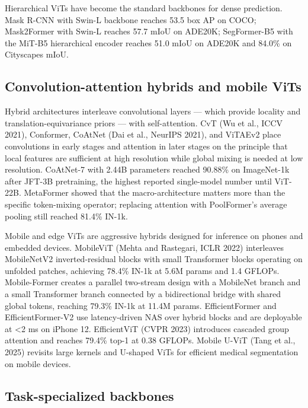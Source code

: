 \documentclass{article}
\begin{document}
Hierarchical ViTs have become the standard backbones for dense prediction. Mask R-CNN with Swin-L backbone reaches 53.5 box AP on COCO; Mask2Former with Swin-L reaches 57.7 mIoU on ADE20K; SegFormer-B5 with the MiT-B5 hierarchical encoder reaches 51.0 mIoU on ADE20K and 84.0\% on Cityscapes mIoU.

\subsection{Convolution-attention hybrids and mobile ViTs}\label{convolution-attention-hybrids-and-mobile-vits}

Hybrid architectures interleave convolutional layers --- which provide locality and translation-equivariance priors --- with self-attention. CvT (Wu et al., ICCV 2021), Conformer, CoAtNet (Dai et al., NeurIPS 2021), and ViTAEv2 \citep{zhang2023vitaev2visiontrans} place convolutions in early stages and attention in later stages on the principle that local features are sufficient at high resolution while global mixing is needed at low resolution. CoAtNet-7 with 2.44B parameters reached 90.88\% on ImageNet-1k after JFT-3B pretraining, the highest reported single-model number until ViT-22B. MetaFormer \citep{yu2022cocacontrastivecap} showed that the macro-architecture matters more than the specific token-mixing operator; replacing attention with PoolFormer's average pooling still reached 81.4\% IN-1k.

Mobile and edge ViTs are aggressive hybrids designed for inference on phones and embedded devices. MobileViT (Mehta and Rastegari, ICLR 2022) interleaves MobileNetV2 inverted-residual blocks with small Transformer blocks operating on unfolded patches, achieving 78.4\% IN-1k at 5.6M params and 1.4 GFLOPs. Mobile-Former \citep{chen2022mobileformerbridgi} creates a parallel two-stream design with a MobileNet branch and a small Transformer branch connected by a bidirectional bridge with shared global tokens, reaching 79.3\% IN-1k at 11.4M params. EfficientFormer and EfficientFormer-V2 use latency-driven NAS over hybrid blocks and are deployable at \textless2 ms on iPhone 12. EfficientViT (CVPR 2023) introduces cascaded group attention and reaches 79.4\% top-1 at 0.38 GFLOPs. Mobile U-ViT (Tang et al., 2025) revisits large kernels and U-shaped ViTs for efficient medical segmentation on mobile devices.

\subsection{Task-specialized backbones}\label{task-specialized-backbones}
\end{document}
